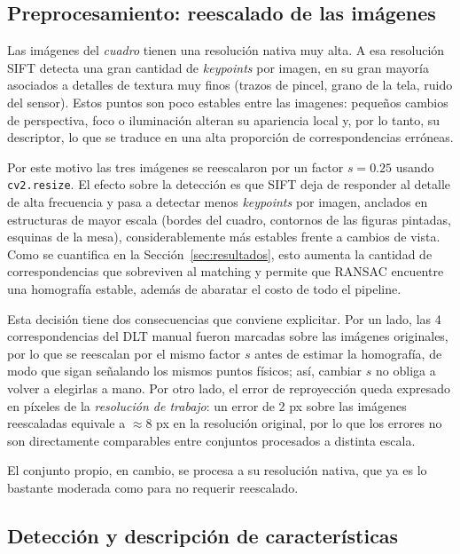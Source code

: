 \documentclass[conference]{IEEEtran}
\begin{document}
\subsection{Preprocesamiento: reescalado de las imágenes}
\label{sec:escalado}

Las imágenes del \textit{cuadro} tienen una resolución nativa muy alta. A esa resolución SIFT detecta una gran cantidad de \textit{keypoints} por imagen, en su gran mayoría asociados a detalles de textura muy finos (trazos de pincel, grano de la tela, ruido del sensor). Estos puntos son poco estables entre las imagenes: pequeños cambios de perspectiva, foco o iluminación alteran su apariencia local y, por lo tanto, su descriptor, lo que se traduce en una alta proporción de correspondencias erróneas.

Por este motivo las tres imágenes se reescalaron por un factor $s=0.25$ usando \texttt{cv2.resize}. El efecto sobre la detección es que SIFT deja de responder al detalle de alta frecuencia y pasa a detectar menos \textit{keypoints} por imagen, anclados en estructuras de mayor escala (bordes del cuadro, contornos de las figuras pintadas, esquinas de la mesa), considerablemente más estables frente a cambios de vista. Como se cuantifica en la Sección~\ref{sec:resultados}, esto aumenta la cantidad de correspondencias que sobreviven al matching y permite que RANSAC encuentre una homografía estable, además de abaratar el costo de todo el pipeline.

Esta decisión tiene dos consecuencias que conviene explicitar. Por un lado, las 4 correspondencias del DLT manual fueron marcadas sobre las imágenes originales, por lo que se reescalan por el mismo factor $s$ antes de estimar la homografía, de modo que sigan señalando los mismos puntos físicos; así, cambiar $s$ no obliga a volver a elegirlas a mano. Por otro lado, el error de reproyección queda expresado en píxeles de la \emph{resolución de trabajo}: un error de 2 px sobre las imágenes reescaladas equivale a $\approx 8$ px en la resolución original, por lo que los errores no son directamente comparables entre conjuntos procesados a distinta escala.

El conjunto propio, en cambio, se procesa a su resolución nativa, que ya es lo bastante moderada como para no requerir reescalado.

\subsection{Detección y descripción de características}
\end{document}
